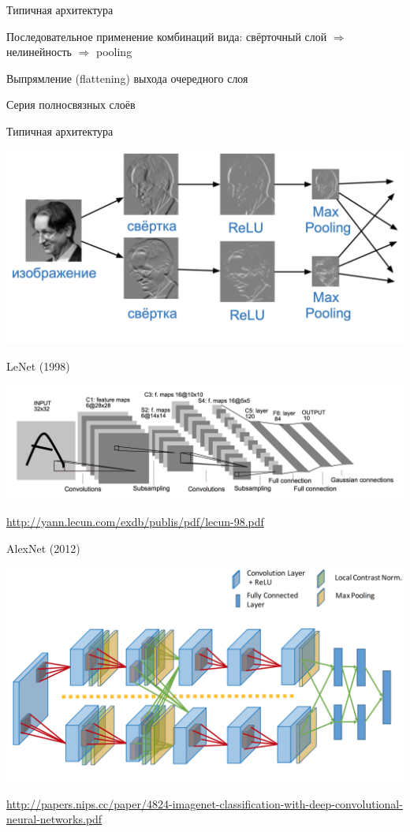 \documentclass[notes,12pt, aspectratio=169]{beamer}
\newenvironment{wideitemize}{\itemize\addtolength{\itemsep}{10pt}}{\enditemize}
\begin{document}
\begin{frame}{Типичная архитектура}
\begin{wideitemize}
	\item   Последовательное применение комбинаций вида: свёрточный слой $\Rightarrow$ нелинейность $\Rightarrow$ pooling
	\item  Выпрямление (flattening) выхода очередного слоя
	\item  Серия полносвязных слоёв
\end{wideitemize}
\end{frame}


\begin{frame}{Типичная архитектура}
	\begin{center}
		\includegraphics[width=.9\linewidth]{conv_man.png}
	\end{center}
\end{frame}


\begin{frame}{LeNet (1998)}
	\begin{center}
		\includegraphics[width=.99\linewidth]{lenet.png}
	\end{center}
	\vfill
	\scriptsize
	{\color{blue} \url{http://yann.lecun.com/exdb/publis/pdf/lecun-98.pdf}}
\end{frame}


\begin{frame}{AlexNet (2012)}
	\begin{center}
		\includegraphics[width=.8\linewidth]{alexnet.png}
	\end{center}
	\vfill
	\scriptsize
	{\color{blue} \url{http://papers.nips.cc/paper/4824-imagenet-classification-with-deep-convolutional-neural-networks.pdf}}
\end{frame}
\end{document}
